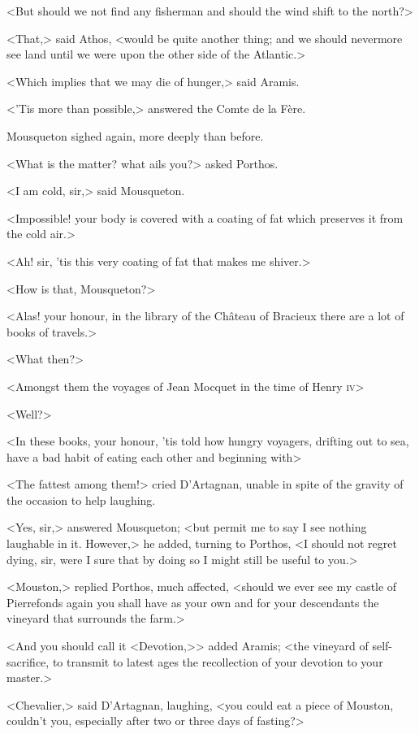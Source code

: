<But should we not find any fisherman and should the wind shift to the north?>

<That,> said Athos, <would be quite another thing; and we should nevermore see land until we were upon the other side of the Atlantic.>

<Which implies that we may die of hunger,> said Aramis.

<'Tis more than possible,> answered the Comte de la Fère.

Mousqueton sighed again, more deeply than before.

<What is the matter? what ails you?> asked Porthos.

<I am cold, sir,> said Mousqueton.

<Impossible! your body is covered with a coating of fat which preserves it from the cold air.>

<Ah! sir, 'tis this very coating of fat that makes me shiver.>

<How is that, Mousqueton?>

<Alas! your honour, in the library of the Château of Bracieux there are a lot of books of travels.>

<What then?>

<Amongst them the voyages of Jean Mocquet in the time of Henry \textsc{iv}>

<Well?>

<In these books, your honour, 'tis told how hungry voyagers, drifting out to sea, have a bad habit of eating each other and beginning with\longdash>

<The fattest among them!> cried D'Artagnan, unable in spite of the gravity of the occasion to help laughing.

<Yes, sir,> answered Mousqueton; <but permit me to say I see nothing laughable in it. However,> he added, turning to Porthos, <I should not regret dying, sir, were I sure that by doing so I might still be useful to you.>

<Mouston,> replied Porthos, much affected, <should we ever see my castle of Pierrefonds again you shall have as your own and for your descendants the vineyard that surrounds the farm.>

<And you should call it <Devotion,>> added Aramis; <the vineyard of self-sacrifice, to transmit to latest ages the recollection of your devotion to your master.>

<Chevalier,> said D'Artagnan, laughing, <you could eat a piece of Mouston, couldn't you, especially after two or three days of fasting?>

